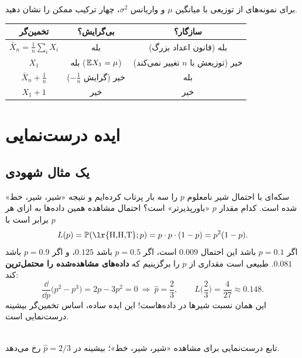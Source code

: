 \begin{example}
برای نمونه‌های  از توزیعی با میانگین $\mu$ و واریانس $\sigma^2$، چهار ترکیب ممکن را نشان دهید.
\begin{solution}
\begin{center}
\renewcommand{\arraystretch}{1.5}
\begin{tabular}{c|c|c}
تخمین‌گر & بی‌گرایش؟ & سازگار؟\\\hline
$\bar X_n=\frac1n\sum_iX_i$ & بله & بله (قانون اعداد بزرگ)\\
$X_1$ & بله ($\mathbb{E} X_1=\mu$) & خیر (توزیعش با $n$ تغییر نمی‌کند)\\
$\bar X_n+\frac1n$ & خیر (گرایش $-\frac1n$) & بله\\
$X_1+1$ & خیر & خیر
\end{tabular}
\end{center}
\end{solution}
\end{example}

\section{ایده درست‌نمایی}

\subsection{یک مثال شهودی}
سکه‌ای با احتمال شیر نامعلوم $p$ را سه بار پرتاب کرده‌ایم و نتیجه «شیر، شیر، خط» شده است. کدام مقدار $p$ «باورپذیرتر» است؟ احتمال مشاهده همین داده‌ها به ازای هر $p$ برابر است با
\[
L(p)=\Prob(\text{\lr{H,H,T}};p)=p\cdot p\cdot(1-p)=p^2(1-p).
\]
اگر $p=0.1$ باشد این احتمال $0.009$ است، اگر $p=0.5$ باشد $0.125$، و اگر $p=0.9$ باشد $0.081$. طبیعی است مقداری از $p$ را برگزینیم که \textbf{داده‌های مشاهده‌شده را محتمل‌ترین} کند:
\[
\frac{\dd}{\dd p}\big(p^2-p^3\big)=2p-3p^2=0\ \Rightarrow\ \hat p=\frac23,\qquad L\Big(\frac23\Big)=\frac{4}{27}\approx0.148 .
\]
این همان نسبت شیرها در داده‌هاست! این ایده ساده، اساس تخمین‌گر بیشینه درست‌نمایی است.

\begin{center}
\\
{\small تابع درست‌نمایی برای مشاهده «شیر، شیر، خط»؛ بیشینه در $\hat p=2/3$ رخ می‌دهد.}
\end{center}

